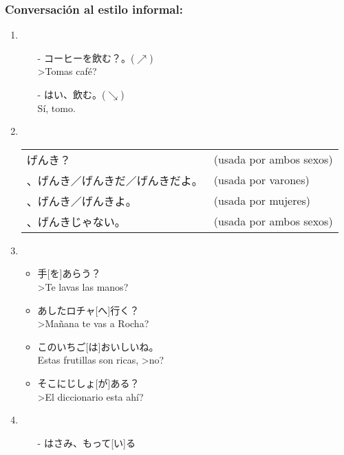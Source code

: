 \documentclass[a4paper,12pt,oneside]{report}
\begin{document}
\begin{CJK*}{UTF8}{min}
      \subsubsection{Conversación al estilo informal:}
        \begin{enumerate}
          \item
            \begin{itemize}
              \item[-] コーヒーを飲む？。($\nearrow$)\\
                       >Tomas café?
              \item[-] はい、飲む。($\searrow$)\\
                       S\'i, tomo.
            \end{itemize}
          \item \hfill\\
            \begin{tabular}{ll}
              げんき？ & (usada por ambos sexos) \\
              、げんき／げんきだ／げんきだよ。 & (usada por varones) \\
              、げんき／げんきよ。 & (usada por mujeres) \\
              、げんきじゃない。 & (usada por ambos sexos) \\
            \end{tabular}
          \item
            \begin{itemize}
              \item 手[を]あらう？\\
                    >Te lavas las manos?
              \item あしたロチャ[へ]行く？\\
                    >Mañana te vas a Rocha?
              \item このいちご[は]おいしいね。\\
                    Estas frutillas son ricas, >no?
              \item そこにじしょ[が]ある？\\
                    >El diccionario esta ahí?
            \end{itemize}
          \item
            \begin{itemize}
              \item[-] はさみ、もって[い]る\\

\end{itemize}
\end{enumerate}
\end{CJK*}
\end{document}
